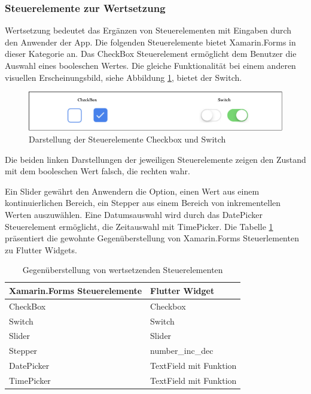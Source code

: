 

\subsubsection{Steuerelemente zur Wertsetzung}
Wertsetzung bedeutet das Ergänzen von Steuerelementen mit Eingaben durch den Anwender der App.  Die folgenden Steuerelemente bietet Xamarin.Forms in dieser Kategorie an.  Das \glq CheckBox\grq{}  Steuerelement ermöglicht dem Benutzer die Auswahl eines boole­schen Wertes.  Die gleiche Funktionalität bei einem anderen visuellen Erscheinungsbild, siehe Abbildung  \ref{fig:SwitchCheckbox},  bietet der \glq Switch\grq{}.  

\begin{figure}[!ht]
 \includegraphics[width=\textwidth,height=\textheight,keepaspectratio]{Images/CrossPlattformFrameworks/SwitchTextBox.png}
 \caption{Darstellung der Steuerelemente \glq Checkbox\grq{} und \glq Switch\grq}
 \label{fig:SwitchCheckbox}
\end{figure}
Die beiden linken Darstellungen der jeweiligen Steuerelemente zeigen den Zustand mit dem booleschen Wert falsch,  die rechten wahr.

Ein  \glq Slider\grq{}  gewährt den Anwendern die Option, einen Wert aus einem kontinuierlichen Bereich,  ein \glq Stepper\grq{}  aus einem Bereich von inkrementellen Werten auszuwählen.  Eine Datumsauswahl wird durch das \glq DatePicker\grq{} Steuerelement ermöglicht,  die Zeitauswahl mit \glq TimePicker\grq{}.  Die Tabelle \ref{tab:valuecontrols} präsentiert die gewohnte Gegenüberstellung von Xamarin.Forms Steuerlementen zu Flutter Widgets. 

\begin{table}[!ht]
\begin{tabularx}{\textwidth}{|X|X|}
\hline
   \textbf{Xamarin.Forms Steuerelemente} & \textbf{Flutter Widget}  \\
\hline
	CheckBox		       				&  Checkbox	 		\\ 
	Switch		       					&  Switch	 		\\ 
	Slider		       					&  Slider	 		\\ 
	Stepper		       				&  number\_inc\_dec	 		\\ 
	DatePicker		       			&  TextField mit Funktion		\\ 
	TimePicker		       			&  TextField mit Funktion	 		\\ 
	\hline
\end{tabularx}
\caption{Gegenüberstellung  von wertsetzenden Steuerelementen}
 \label{tab:valuecontrols}
\end{table}
 
